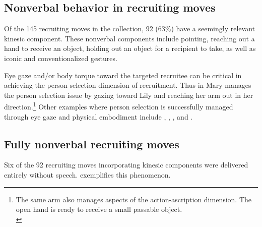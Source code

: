 \documentclass[output=paper,nonflat,colorlinks,citecolor=brown]{langsci/langscibook}
\begin{document}
\subsection{Nonverbal behavior in recruiting moves}\label{sec:blythe:3.1}

Of the 145 recruiting moves in the collection, 92 (63\%) have a seemingly relevant kinesic component. These nonverbal components include pointing, reaching out a hand to receive an object, holding out an object for a recipient to take, as well as iconic and conventionalized gestures.

Eye gaze and/or body torque toward the targeted recruitee can be critical in achieving the person-selection dimension of recruitment.  Thus in  Mary manages the person selection issue by gazing toward Lily and reaching her arm out in her direction.\footnote{The same arm also manages aspects of the action-ascription dimension. The open hand is ready to receive a small passable object.  \\
} Other examples where person selection is successfully managed through eye gaze and physical embodiment include , , ,  and .

\subsection{Fully nonverbal recruiting moves}\label{sec:blythe:3.2}

Six of the 92 recruiting moves incorporating kinesic components were delivered entirely without speech.  exemplifies this phenomenon.
\end{document}
